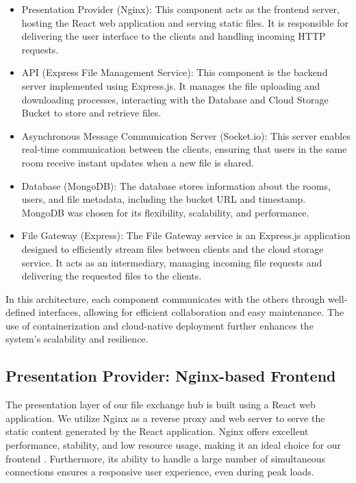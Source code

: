 \documentclass[a4paper,fleqn]{cas-dc}
\begin{document}
\begin{itemize}
\item Presentation Provider (Nginx): This component acts as the frontend server, hosting the React web application and serving static files. It is responsible for delivering the user interface to the clients and handling incoming HTTP requests.
\item API (Express File Management Service): This component is the backend server implemented using Express.js. It manages the file uploading and downloading processes, interacting with the Database and Cloud Storage Bucket to store and retrieve files.
\item Asynchronous Message Communication Server (Socket.io): This server enables real-time communication between the clients, ensuring that users in the same room receive instant updates when a new file is shared.
\item Database (MongoDB): The database stores information about the rooms, users, and file metadata, including the bucket URL and timestamp. MongoDB was chosen for its flexibility, scalability, and performance.
\item File Gateway (Express): The File Gateway service is an Express.js application designed to efficiently stream files between clients and the cloud storage service. It acts as an intermediary, managing incoming file requests and delivering the requested files to the clients.
\end{itemize}

In this architecture, each component communicates with the others through well-defined interfaces, allowing for efficient collaboration and easy maintenance. The use of containerization and cloud-native deployment further enhances the system's scalability and resilience.

\subsection{Presentation Provider: Nginx-based Frontend}

The presentation layer of our file exchange hub is built using a React web application. We utilize Nginx as a reverse proxy and web server to serve the static content generated by the React application. Nginx offers excellent performance, stability, and low resource usage, making it an ideal choice for our frontend \cite{Li2020}. Furthermore, its ability to handle a large number of simultaneous connections ensures a responsive user experience, even during peak loads.
\end{document}
